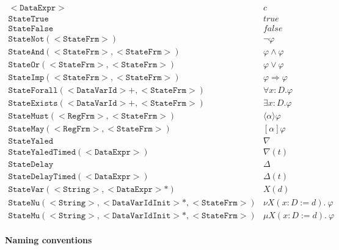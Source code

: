 \documentclass{article}
\begin{document}
\begin{equation*}
\begin{array}{ll}
\mathtt{<DataExpr>} & c \\ 
\mathtt{StateTrue} & true \\ 
\mathtt{StateFalse} & false \\ 
\mathtt{StateNot(<StateFrm>)} & \lnot \varphi \\ 
\mathtt{StateAnd(<StateFrm>,<StateFrm>)} & \varphi \wedge \varphi \\ 
\mathtt{StateOr(<StateFrm>,<StateFrm>)} & \varphi \vee \varphi \\ 
\mathtt{StateImp(<StateFrm>,<StateFrm>)} & \varphi \Rightarrow \varphi \\ 
\mathtt{StateForall(<DataVarId>+,<StateFrm>)} & \forall x{:}D.\varphi \\ 
\mathtt{StateExists(<DataVarId>+,<StateFrm>)} & \exists x{:}D.\varphi \\ 
\mathtt{StateMust(<RegFrm>,<StateFrm>)} & \langle \alpha \rangle \varphi \\ 
\mathtt{StateMay(<RegFrm>,<StateFrm>)} & [\alpha ]\varphi \\ 
\mathtt{StateYaled} & \nabla \\ 
\mathtt{StateYaledTimed(<DataExpr>)} & \nabla (t) \\ 
\mathtt{StateDelay} & \Delta \\ 
\mathtt{StateDelayTimed(<DataExpr>)} & \Delta (t) \\ 
\mathtt{StateVar(<String>,<DataExpr>\ast )} & X(d) \\ 
\mathtt{StateNu(<String>,<DataVarIdInit>\ast ,<StateFrm>)} & \nu X(x{:}%
D:=d).~\varphi \\ 
\mathtt{StateMu(<String>,<DataVarIdInit>\ast ,<StateFrm>)} & \mu X(x{:}%
D:=d).~\varphi%
\end{array}%
\end{equation*}

\paragraph{Naming conventions}
\end{document}
